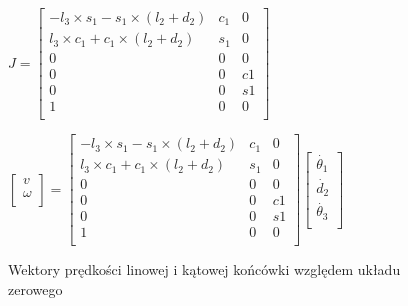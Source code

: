 \begin{figure}[H]
\centering

$J=
\begin{bmatrix}
-l_3\times s_1 - s_1\times(l_2+d_2) &c_1 &0\\
l_3\times c_1+c_1\times(l_2+d_2) & s_1 & 0 \\
0 & 0 & 0\\
0 & 0 & c1\\
0 & 0 & s1 \\
1 & 0 & 0\\
\end{bmatrix}  $
 
  \end{figure}

\begin{figure}[H]
\centering

$
\begin{bmatrix}
v\\
\omega \\
\end{bmatrix}
=
\begin{bmatrix}
-l_3\times s_1 - s_1\times(l_2+d_2) &c_1 &0\\
l_3\times c_1+c_1\times(l_2+d_2) & s_1 & 0 \\
0 & 0 & 0\\
0 & 0 & c1\\
0 & 0 & s1 \\
1 & 0 & 0\\
\end{bmatrix}  
\begin{bmatrix}
\dot{\theta_1} \\
\dot{d_2} \\
\dot{\theta_3}\\

\end{bmatrix}  $
\caption{Wektory prędkości linowej i kątowej końcówki względem układu zerowego} 
  \end{figure}